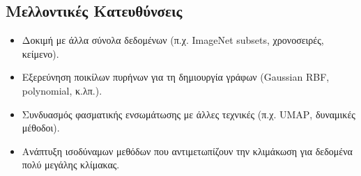 \documentclass[a4paper,11pt]{article}
\newcommand{\lt}[1]{\foreignlanguage{english}{#1}}
\begin{document}
\subsection{Μελλοντικές Κατευθύνσεις}
\begin{itemize}
  \item Δοκιμή με άλλα σύνολα δεδομένων (π.χ. \lt{ImageNet} subsets, χρονοσειρές, κείμενο).
  \item Εξερεύνηση ποικίλων πυρήνων για τη δημιουργία γράφων (Gaussian \lt{RBF}, polynomial, κ.λπ.).
  \item Συνδυασμός φασματικής ενσωμάτωσης με άλλες τεχνικές (π.χ. \lt{UMAP}, δυναμικές μέθοδοι).
  \item Ανάπτυξη ισοδύναμων μεθόδων που αντιμετωπίζουν την κλιμάκωση για δεδομένα πολύ μεγάλης κλίμακας.
\end{itemize}
\end{document}
